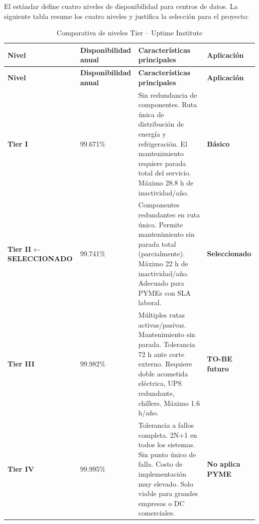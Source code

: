 \documentclass[11pt, a4paper, oneside]{report}
\begin{document}
El estándar \citet{uptimeinstitute} define cuatro niveles de disponibilidad para centros de datos. La siguiente tabla resume los cuatro niveles y justifica la selección para el proyecto:

\renewcommand{\arraystretch}{1.3}
\footnotesize

\begin{xltabular}{\textwidth}{@{}|L{2.2cm}|C{2.8cm}|X|C{2.2cm}|@{}}
\caption{Comparativa de niveles Tier -- Uptime Institute}
\label{tab:comparativa_tier} \\

\parbox[c][1.1cm][c]{\linewidth}{\centering\color{white}\bfseries\small Nivel} &
\parbox[c][1.1cm][c]{\linewidth}{\centering\color{white}\bfseries\small Disponibilidad anual} &
\parbox[c][1.1cm][c]{\linewidth}{\centering\color{white}\bfseries\small Características principales} &
\parbox[c][1.1cm][c]{\linewidth}{\centering\color{white}\bfseries\small Aplicación} \\ \hline
\endfirsthead

\parbox[c][1.1cm][c]{\linewidth}{\centering\color{white}\bfseries\small Nivel} &
\parbox[c][1.1cm][c]{\linewidth}{\centering\color{white}\bfseries\small Disponibilidad anual} &
\parbox[c][1.1cm][c]{\linewidth}{\centering\color{white}\bfseries\small Características principales} &
\parbox[c][1.1cm][c]{\linewidth}{\centering\color{white}\bfseries\small Aplicación} \\ \hline
\endhead

\hline
\endfoot

{\small \textbf{Tier I}} & {\small 99.671\%} & {\small Sin redundancia de componentes. Ruta única de distribución de energía y refrigeración. El mantenimiento requiere parada total del servicio. Máximo 28.8 h de inactividad/año.} & {\small \textcolor{hint_gray}{\textbf{Básico}}} \\ \hline

{\small \textbf{Tier II} ← \textcolor{upeu_gold}{\textbf{SELECCIONADO}}} & {\small 99.741\%} & {\small Componentes redundantes en ruta única. Permite mantenimiento sin parada total (parcialmente). Máximo 22 h de inactividad/año. Adecuado para PYMEs con SLA laboral.} & {\small \textcolor{upeu_gold}{\textbf{Seleccionado}}} \\ \hline

{\small \textbf{Tier III}} & {\small 99.982\%} & {\small Múltiples rutas activas/pasivas. Mantenimiento sin parada. Tolerancia 72 h ante corte externo. Requiere doble acometida eléctrica, UPS redundante, chillers. Máximo 1.6 h/año.} & {\small \textcolor{hint_gray}{\textbf{TO-BE futuro}}} \\ \hline

{\small \textbf{Tier IV}} & {\small 99.995\%} & {\small Tolerancia a fallos completa. 2N+1 en todos los sistemas. Sin punto único de falla. Costo de implementación muy elevado. Solo viable para grandes empresas o DC comerciales.} & {\small \textcolor{sev_critico}{\textbf{No aplica PYME}}} \\ \hline

\end{xltabular}
\normalsize
\end{document}

